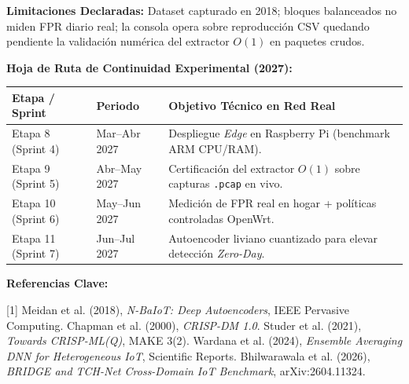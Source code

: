 \documentclass[final]{article}
\begin{document}
\begin{tcbposter}
{  \vspace{2.5mm}
  \textbf{Limitaciones Declaradas:} Dataset capturado en 2018; bloques balanceados no miden FPR diario real; la consola opera sobre reproducción CSV quedando pendiente la validación numérica del extractor $O(1)$ en paquetes crudos.

  \vfill
  \par\noindent\textbf{Hoja de Ruta de Continuidad Experimental (2027):}
  \par\vspace{1.5mm}\noindent
  {\renewcommand{\arraystretch}{1.18}\fontsize{14.5}{18.5}\selectfont
  \begin{tabularx}{\linewidth}{@{}p{5.2cm} p{3.8cm} X@{}}
    \toprule
    \textbf{Etapa / Sprint} & \textbf{Periodo} & \textbf{Objetivo Técnico en Red Real} \\
    \midrule
    Etapa 8 (Sprint 4) & Mar--Abr 2027 & Despliegue \textit{Edge} en Raspberry Pi (benchmark ARM CPU/RAM). \\
    Etapa 9 (Sprint 5) & Abr--May 2027 & Certificación del extractor $O(1)$ sobre capturas \texttt{.pcap} en vivo. \\
    Etapa 10 (Sprint 6) & May--Jun 2027 & Medición de FPR real en hogar + políticas controladas OpenWrt. \\
    Etapa 11 (Sprint 7) & Jun--Jul 2027 & Autoencoder liviano cuantizado para elevar detección \textit{Zero-Day}. \\
    \bottomrule
  \end{tabularx}}

  \vfill
  \par\noindent\textbf{Referencias Clave:}\par\vspace{1mm}
  {\fontsize{13.5}{17.5}\selectfont\color{CINFGray}
  [1] Meidan et al. (2018), \textit{N-BaIoT: Deep Autoencoders}, IEEE Pervasive Computing. \quad
  [2] Chapman et al. (2000), \textit{CRISP-DM 1.0}. \quad
  [3] Studer et al. (2021), \textit{Towards CRISP-ML(Q)}, MAKE 3(2). \quad
  [4] Wardana et al. (2024), \textit{Ensemble Averaging DNN for Heterogeneous IoT}, Scientific Reports. \quad
  [5] Bhilwarawala et al. (2026), \textit{BRIDGE and TCH-Net Cross-Domain IoT Benchmark}, arXiv:2604.11324.
  }
}


\end{tcbposter}
\end{document}
